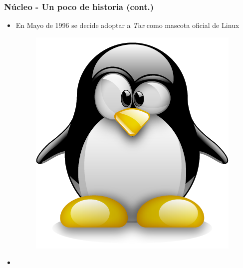 \begin{frame}
	\frametitle{Núcleo - Un poco de historia (cont.)}
	\begin{itemize}
		\item En Mayo de 1996 se decide adoptar a \emph{Tux} como mascota oficial de Linux
		\begin{figure}
			\centering
			\includegraphics[scale=0.1]{images/tux.png}
		\end{figure}
		\item 
	\end{itemize}
\end{frame}

